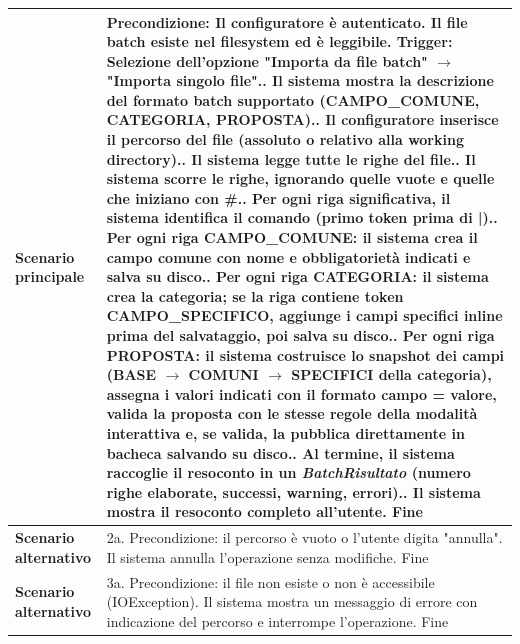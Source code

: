 \documentclass[12pt, a4paper, oneside]{report}
\begin{document}
\begin{tabularx}{\textwidth}{|l|X|}
    \textbf{Scenario principale} & 
    Precondizione: Il configuratore è autenticato. Il file batch esiste nel filesystem ed è leggibile.\newline
    Trigger: Selezione dell'opzione "Importa da file batch" $\rightarrow$ "Importa singolo file".\newline
    1. Il sistema mostra la descrizione del formato batch supportato (CAMPO\_COMUNE, CATEGORIA, PROPOSTA).\newline
    2. Il configuratore inserisce il percorso del file (assoluto o relativo alla working directory).\newline
    3. Il sistema legge tutte le righe del file.\newline
    4. Il sistema scorre le righe, ignorando quelle vuote e quelle che iniziano con \#.\newline
    5. Per ogni riga significativa, il sistema identifica il comando (primo token prima di |).\newline
    6. Per ogni riga CAMPO\_COMUNE: il sistema crea il campo comune con nome e obbligatorietà indicati e salva su disco.\newline
    7. Per ogni riga CATEGORIA: il sistema crea la categoria; se la riga contiene token CAMPO\_SPECIFICO, aggiunge i campi specifici inline prima del salvataggio, poi salva su disco.\newline
    8. Per ogni riga PROPOSTA: il sistema costruisce lo snapshot dei campi (BASE $\rightarrow$ COMUNI $\rightarrow$ SPECIFICI della categoria), assegna i valori indicati con il formato campo = valore, valida la proposta con le stesse regole della modalità interattiva e, se valida, la pubblica direttamente in bacheca salvando su disco.\newline
    9. Al termine, il sistema raccoglie il resoconto in un \textit{BatchRisultato} (numero righe elaborate, successi, warning, errori).\newline
    10. Il sistema mostra il resoconto completo all'utente.\newline
    Fine \\ \hline
    
    \textbf{Scenario alternativo} & 
    2a. Precondizione: il percorso è vuoto o l'utente digita "annulla".\newline
    Il sistema annulla l'operazione senza modifiche.\newline
    Fine \\ \hline

    \textbf{Scenario alternativo} & 
    3a. Precondizione: il file non esiste o non è accessibile (IOException).\newline
    Il sistema mostra un messaggio di errore con indicazione del percorso e interrompe l'operazione.\newline
    Fine \\ \hline


\end{tabularx}
\end{document}
